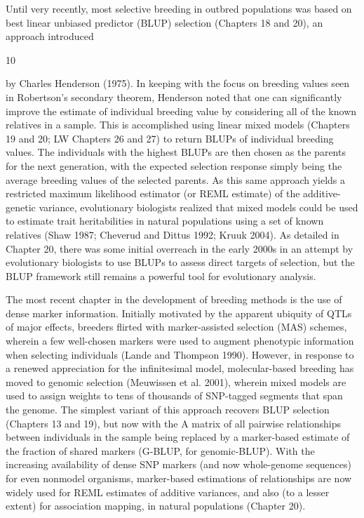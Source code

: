 \documentclass{article}
\begin{document}
Until very recently, most selective breeding in outbred populations was based on best linear unbiased predictor (BLUP) selection (Chapters 18 and 20), an approach introduced

10

by Charles Henderson (1975). In keeping with the focus on breeding values seen in Robertson's secondary theorem, Henderson noted that one can significantly improve the estimate of individual breeding value by considering all of the known relatives in a sample. This is accomplished using linear mixed models (Chapters 19 and 20; LW Chapters 26 and 27) to return BLUPs of individual breeding values. The individuals with the highest BLUPs are then chosen as the parents for the next generation, with the expected selection response simply being the average breeding values of the selected parents. As this same approach yields a restricted maximum likelihood estimator (or REML estimate) of the additive-genetic variance, evolutionary biologists realized that mixed models could be used to estimate trait heritabilities in natural populations using a set of known relatives (Shaw 1987; Cheverud and Dittus 1992; Kruuk 2004). As detailed in Chapter 20, there was some initial overreach in the early 2000s in an attempt by evolutionary biologists to use BLUPs to assess direct targets of selection, but the BLUP framework still remains a powerful tool for evolutionary analysis.

The most recent chapter in the development of breeding methods is the use of dense marker information. Initially motivated by the apparent ubiquity of QTLs of major effects, breeders flirted with marker-assisted selection (MAS) schemes, wherein a few well-chosen markers were used to augment phenotypic information when selecting individuals (Lande and Thompson 1990). However, in response to a renewed appreciation for the infinitesimal model, molecular-based breeding has moved to genomic selection (Meuwissen et al. 2001), wherein mixed models are used to assign weights to tens of thousands of SNP-tagged segments that span the genome. The simplest variant of this approach recovers BLUP selection (Chapters 13 and 19), but now with the A matrix of all pairwise relationships between individuals in the sample being replaced by a marker-based estimate of the fraction of shared markers (G-BLUP, for genomic-BLUP). With the increasing availability of dense SNP markers (and now whole-genome sequences) for even nonmodel organisms, marker-based estimations of relationships are now widely used for REML estimates of additive variances, and also (to a lesser extent) for association mapping, in natural populations (Chapter 20).
\end{document}
